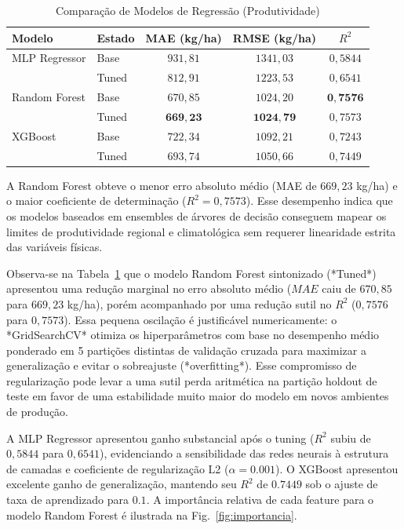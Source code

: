 \documentclass[conference]{IEEEtran}
\begin{document}
\begin{table}[h]
\centering
\caption{Comparação de Modelos de Regressão (Produtividade)}
\label{tab:resultados_regressao}
\footnotesize
\setlength{\tabcolsep}{4.5pt}
\begin{tabular}{llccc}
\toprule
\textbf{Modelo} & \textbf{Estado} & \textbf{MAE (kg/ha)} & \textbf{RMSE (kg/ha)} & \textbf{$R^2$} \\
\midrule
MLP Regressor & Base & $931{,}81$ & $1341{,}03$ & $0{,}5844$ \\
 & Tuned & $812{,}91$ & $1223{,}53$ & $0{,}6541$ \\
\midrule
Random Forest & Base & $670{,}85$ & $1024{,}20$ & $\mathbf{0{,}7576}$ \\
 & Tuned & $\mathbf{669{,}23}$ & $\mathbf{1024{,}79}$ & $0{,}7573$ \\
\midrule
XGBoost & Base & $722{,}34$ & $1092{,}21$ & $0{,}7243$ \\
 & Tuned & $693{,}74$ & $1050{,}66$ & $0{,}7449$ \\
\bottomrule
\end{tabular}
\end{table}

A Random Forest obteve o menor erro absoluto médio (MAE de $669{,}23$ kg/ha) e o maior coeficiente de determinação ($R^2 = 0{,}7573$). Esse desempenho indica que os modelos baseados em ensembles de árvores de decisão conseguem mapear os limites de produtividade regional e climatológica sem requerer linearidade estrita das variáveis físicas. 

Observa-se na Tabela~\ref{tab:resultados_regressao} que o modelo Random Forest sintonizado (*Tuned*) apresentou uma redução marginal no erro absoluto médio ($MAE$ caiu de $670{,}85$ para $669{,}23$ kg/ha), porém acompanhado por uma redução sutil no $R^2$ ($0{,}7576$ para $0{,}7573$). Essa pequena oscilação é justificável numericamente: o *GridSearchCV* otimiza os hiperparâmetros com base no desempenho médio ponderado em 5 partições distintas de validação cruzada para maximizar a generalização e evitar o sobreajuste (*overfitting*). Esse compromisso de regularização pode levar a uma sutil perda aritmética na partição holdout de teste em favor de uma estabilidade muito maior do modelo em novos ambientes de produção.

A MLP Regressor apresentou ganho substancial após o tuning ($R^2$ subiu de $0{,}5844$ para $0{,}6541$), evidenciando a sensibilidade das redes neurais à estrutura de camadas e coeficiente de regularização L2 ($\alpha = 0.001$). O XGBoost apresentou excelente ganho de generalização, mantendo seu $R^2$ de $0.7449$ sob o ajuste de taxa de aprendizado para $0.1$. A importância relativa de cada feature para o modelo Random Forest é ilustrada na Fig.~\ref{fig:importancia}.
\end{document}
